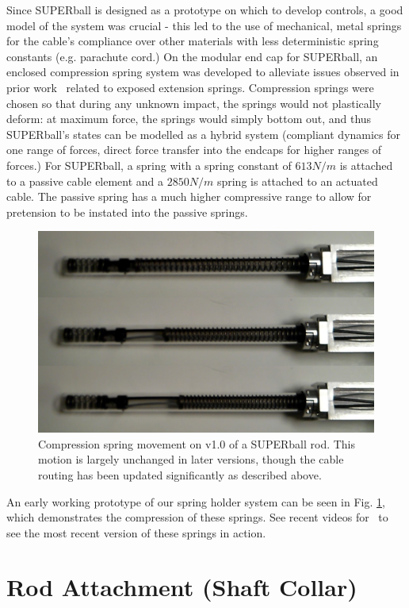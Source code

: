 \documentclass[12pt]{report}
\begin{document}
Since SUPERball is designed as a prototype on which to develop controls, a good model of the system was crucial - this led to the use of mechanical, metal springs for the cable's compliance over other materials with less deterministic spring constants (e.g. parachute cord.) 
On the modular end cap for SUPERball, an enclosed compression spring system was developed to alleviate issues observed in prior work~\cite{Caluwaerts2013rsif,bruce2014design} related to exposed extension springs.
Compression springs were chosen so that during any unknown impact, the springs would not plastically deform: at maximum force, the springs would simply bottom out, and thus SUPERball's states can be modelled as a hybrid system (compliant dynamics for one range of forces, direct force transfer into the endcaps for higher ranges of forces.) 
For SUPERball, a spring with a spring constant of $613 N/m$ is attached to a passive cable element and a $2850 N/m$ spring is attached to an actuated cable.
The passive spring has a much higher compressive range to allow for pretension to be instated into the passive springs. 

\begin{figure}[thpb]
      \centering
      \includegraphics[width=.5\columnwidth]{img/double_spring_series_6-9-14.jpg}
      \caption{Compression spring movement on v1.0 of a SUPERball rod. This motion is largely unchanged in later versions, though the cable routing has been updated significantly as described above.}
      \label{fig:spring_series}
      \vspace{-0.2cm}
\end{figure}

An early working prototype of our spring holder system can be seen in Fig. \ref{fig:spring_series}, which demonstrates the compression of these springs.
See recent videos for~\cite{sabelhaus2015system} to see the most recent version of these springs in action.

\section{Rod Attachment (Shaft Collar)}
\end{document}
